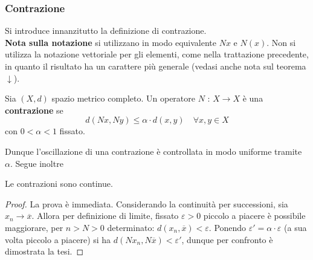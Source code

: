 \documentclass[10pt, oneside]{book}
\theoremstyle{plain}
\begin{document}
\subsubsection{Contrazione}  Si introduce innanzitutto la definizione di contrazione.
\\\textbf{Nota sulla notazione} si utilizzano in modo equivalente $N x$ e $N(x)$. Non si utilizza la notazione vettoriale per gli elementi, come nella trattazione precedente, in quanto il risultato ha un carattere più generale (vedasi anche nota sul teorema $\downarrow$).
\begin{defin}
Sia $(X,d)$ spazio metrico completo. Un operatore $N$ : $X \rightarrow X$ è una \textbf{contrazione} se 
\[d(N x, N y) \leq \alpha \cdot d(x,y) \quad \forall x,y \in X\]
con $0 < \alpha < 1$ fissato.
\end{defin}
Dunque l'oscillazione di una contrazione è controllata in modo uniforme tramite $\alpha$. Segue inoltre
\begin{prop}
Le contrazioni sono continue.
\end{prop}
\begin{proof}
La prova è immediata. Considerando la continuità per successioni, sia $x_n \rightarrow \overline{x}$. Allora per definizione di limite, fissato $\varepsilon > 0$ piccolo a piacere è possibile maggiorare, per $n > N > 0$ determinato: $d(x_n, \overline{x}) < \varepsilon$. Ponendo $\varepsilon' = \alpha \cdot \varepsilon$ (a sua volta piccolo a piacere) si ha $d( N x_n, N \overline{x}) < \varepsilon'$, dunque per confronto è dimostrata la tesi. 
\end{proof}
\end{document}
